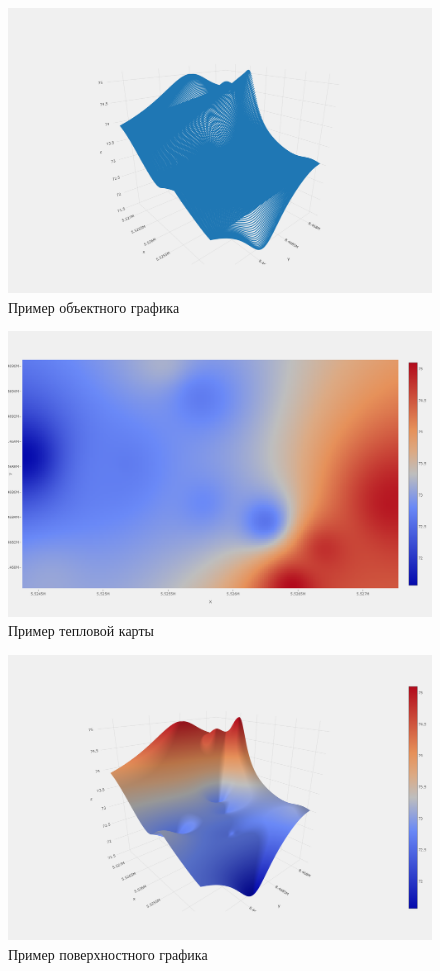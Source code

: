 \begin{figure}[h!]
    \center
    \includegraphics[scale=0.3]{fig/newplot (12).png}
    \caption{Пример объектного графика}
    \label{fig:20}
\end{figure}
\begin{figure}[h!]
    \center
    \includegraphics[scale=0.3]{fig/newplot (13).png}
    \caption{Пример тепловой карты}
    \label{fig:21}
\end{figure}
\begin{figure}[h!]
    \center
    \includegraphics[scale=0.3]{fig/newplot (14).png}
    \caption{Пример поверхностного графика}
    \label{fig:22}
\end{figure}
